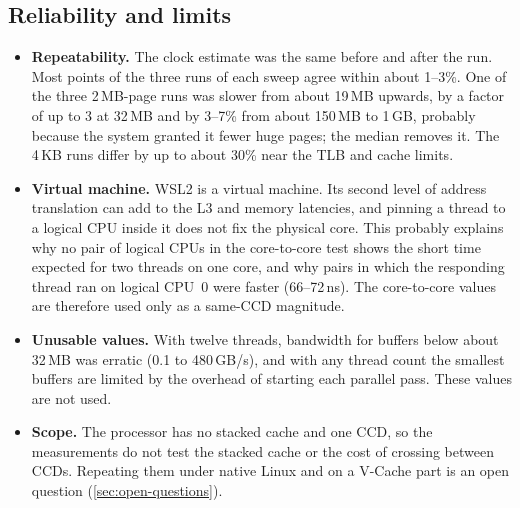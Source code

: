 \subsection*{Reliability and limits}
\begin{itemize}
  \item \textbf{Repeatability.} The clock estimate was the same before and after the run. Most points of the three runs of each sweep agree within about 1--3\%. One of the three 2\,MB-page runs was slower from about 19\,MB upwards, by a factor of up to 3 at 32\,MB and by 3--7\% from about 150\,MB to 1\,GB, probably because the system granted it fewer huge pages; the median removes it. The 4\,KB runs differ by up to about 30\% near the TLB and cache limits.
  \item \textbf{Virtual machine.} WSL2 is a virtual machine. Its second level of address translation can add to the L3 and memory latencies, and pinning a thread to a logical CPU inside it does not fix the physical core. This probably explains why no pair of logical CPUs in the core-to-core test shows the short time expected for two threads on one core, and why pairs in which the responding thread ran on logical CPU~0 were faster (66--72\,ns). The core-to-core values are therefore used only as a same-CCD magnitude.
  \item \textbf{Unusable values.} With twelve threads, bandwidth for buffers below about 32\,MB was erratic (0.1 to 480\,GB/s), and with any thread count the smallest buffers are limited by the overhead of starting each parallel pass. These values are not used.
  \item \textbf{Scope.} The processor has no stacked cache and one CCD, so the measurements do not test the stacked cache or the cost of crossing between CCDs. Repeating them under native Linux and on a V-Cache part is an open question (\cref{sec:open-questions}).
\end{itemize}
